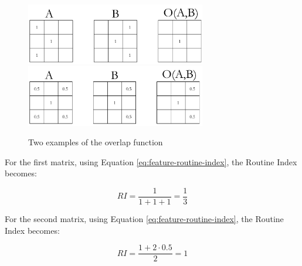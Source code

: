 \begin{figure}[h]
    \centering
    \includegraphics[width=0.7\textwidth]{images/routine-numbers-1.pdf}
    \includegraphics[width=0.7\textwidth]{images/routine-numbers-2.pdf}
    \caption{Two examples of the overlap function}
    \label{fig:routine-matrix-example}
\end{figure}

For the first matrix, using Equation \eqref{eq:feature-routine-index}, the Routine Index becomes:

\begin{equation}
RI = \frac{1}{1 + 1 + 1} = \frac{1}{3}
\end{equation}

For the second matrix, using Equation \eqref{eq:feature-routine-index}, the Routine Index becomes:

\begin{equation}
RI = \frac{1 + 2\cdot 0.5}{2} = 1
\end{equation}

